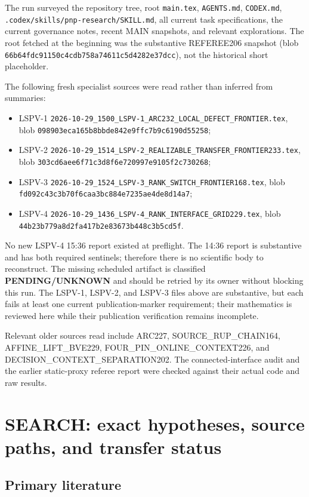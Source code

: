 \documentclass[11pt]{article}
\begin{document}
The run surveyed the repository tree, root \texttt{main.tex}, \texttt{AGENTS.md},
\texttt{CODEX.md}, \texttt{.codex/skills/pnp-research/SKILL.md}, all current task specifications,
the current governance notes, recent MAIN snapshots, and relevant explorations.  The root fetched at
the beginning was the substantive REFEREE206 snapshot (blob
\texttt{66b64fdc91150c4cdb758a74611c5d4282e37dcc}), not the historical short placeholder.

The following fresh specialist sources were read rather than inferred from summaries:
\begin{itemize}
\item LSPV-1 \texttt{2026-10-29\_1500\_LSPV-1\_ARC232\_LOCAL\_DEFECT\_FRONTIER.tex},
blob \texttt{098903eca165b8bbde842e9ffc7b9c6190d55258};
\item LSPV-2 \texttt{2026-10-29\_1514\_LSPV-2\_REALIZABLE\_TRANSFER\_FRONTIER233.tex},
blob \texttt{303cd6aee6f71c3d8f6e720997e9105f2c730268};
\item LSPV-3 \texttt{2026-10-29\_1524\_LSPV-3\_RANK\_SWITCH\_FRONTIER168.tex},
blob \texttt{fd092c43c3b70f6caa3bc884e7235ae4de8d14a7};
\item LSPV-4 \texttt{2026-10-29\_1436\_LSPV-4\_RANK\_INTERFACE\_GRID229.tex},
blob \texttt{44b23b779a8d2fa417b2e83673b448c3b5cd5f}.
\end{itemize}
No new LSPV-4 15:36 report existed at preflight.  The 14:36 report is substantive and has both
required sentinels; therefore there is no scientific body to reconstruct.  The missing scheduled
artifact is classified \textbf{PENDING/UNKNOWN} and should be retried by its owner without blocking
this run.  The LSPV-1, LSPV-2, and LSPV-3 files above are substantive, but each fails at least one
current publication-marker requirement; their mathematics is reviewed here while their publication
verification remains incomplete.

Relevant older sources read include ARC227, SOURCE\_RUP\_CHAIN164,
AFFINE\_LIFT\_BVE229, FOUR\_PIN\_ONLINE\_CONTEXT226, and
DECISION\_CONTEXT\_SEPARATION202.  The connected-interface audit and the earlier static-proxy
referee report were checked against their actual code and raw results.

\section{SEARCH: exact hypotheses, source paths, and transfer status}

\subsection{Primary literature}
\end{document}
